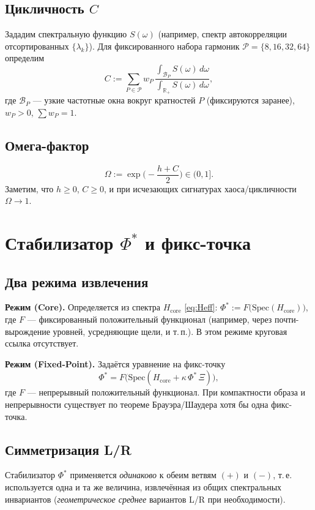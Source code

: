\documentclass[a4paper,12pt]{article}
\begin{document}
\subsection*{Цикличность $C$}
Зададим спектральную функцию $S(\omega)$ (например, спектр автокорреляции отсортированных $\{\lambda_k\}$).
Для фиксированного набора гармоник $\mathcal{P}=\{8,16,32,64\}$ определим
\begin{equation}
C := \sum_{P\in\mathcal{P}} w_P\, \frac{\int_{\mathcal{B}_P} S(\omega)\,d\omega}{\int_{\mathbb{R}_+} S(\omega)\,d\omega},
\end{equation}
где $\mathcal{B}_P$ --- узкие частотные окна вокруг кратностей $P$ (фиксируются заранее), $w_P>0$, $\sum w_P=1$.

\subsection*{Омега-фактор}
\begin{equation}
\Omega := \exp\Big(-\frac{h+C}{2}\Big)\in (0,1].
\end{equation}
Заметим, что $h\ge0$, $C\ge0$, и при исчезающих сигнатурах хаоса/цикличности $\Omega\to1$.

\section{Стабилизатор \texorpdfstring{$\Phi^\ast$}{Phi*} и фикс-точка}
\subsection*{Два режима извлечения}
\textbf{Режим (Core).}
Определяется из спектра $H_{\mathrm{core}}$ \eqref{eq:Heff}: $\Phi^\ast := F\big(\mathrm{Spec}(H_{\mathrm{core}})\big)$, где $F$ --- фиксированный положительный функционал (например, через почти-вырождение уровней, усредняющие щели, и т.\,п.). В этом режиме круговая ссылка отсутствует.

\textbf{Режим (Fixed-Point).}
Задаётся уравнение на фикс-точку
\begin{equation}
\Phi^\ast = F\big(\mathrm{Spec}(H_{\mathrm{core}}+\kappa\,\Phi^\ast\,\Xi)\big),
\end{equation}
где $F$ --- непрерывный положительный функционал. При компактности образа и непрерывности существует по теореме Брауэра/Шаудера хотя бы одна фикс-точка.

\subsection*{Симметризация L/R}
Стабилизатор $\Phi^\ast$ применяется \emph{одинаково} к обеим ветвям $(+)$ и $(-)$, т.\,е. используется одна и та же величина, извлечённая из общих спектральных инвариантов (\emph{геометрическое среднее} вариантов L/R при необходимости).
\end{document}
